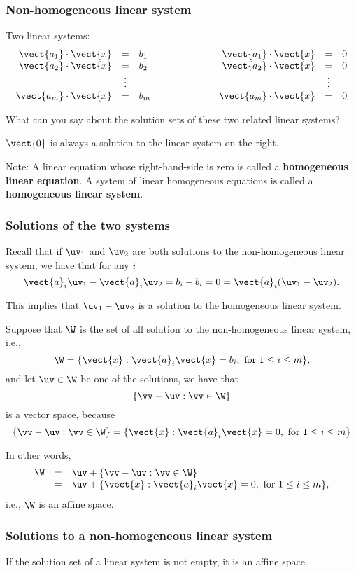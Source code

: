 \begin{frame}
  \frametitle{Non-homogeneous linear system}
  Two linear systems:
  \[
  \begin{array}{rcl}
    \vect{a_1}\cdot\vect{x} &=& b_1 \\
    \vect{a_2}\cdot\vect{x} &=& b_2 \\
    &\vdots&\\
    \vect{a_m}\cdot\vect{x} &=& b_m
  \end{array}
  \ \ \ \ \ \ \ \ \ \ \ \ \ \ \ \ \ \ 
  \begin{array}{rcl}
    \vect{a_1}\cdot\vect{x} &=& 0 \\
    \vect{a_2}\cdot\vect{x} &=& 0 \\
    &\vdots&\\
    \vect{a_m}\cdot\vect{x} &=& 0
  \end{array}
  \]

  What can you say about the solution sets of these two related linear
  systems?

  \pause

  $\vect{0}$ is always a solution to the linear system on the right.

  
  Note: A linear equation whose right-hand-side is zero is called a
  {\bf homogeneous linear equation}.  A system of linear homogeneous
  equations is called a {\bf homogeneous linear system}.
\end{frame}

\begin{frame}
  \frametitle{Solutions of the two systems}

  Recall that if $\uv_1$ and $\uv_2$ are both solutions to the
  non-homogeneous linear system, we have that for any $i$
  \[
  \vect{a}_i \uv_1 - \vect{a}_i \uv_2
  = b_i - b_i = 0 = \vect{a}_i (\uv_1 - \uv_2).
  \]
  \pause

  This implies that $\uv_1-\uv_2$ is a solution to the homogeneous
  linear system.
\end{frame}

\begin{frame}
  Suppose that $\W$ is the set of all solution to the non-homogeneous
  linear system, i.e.,
  \[
  \W = \{\vect{x} : \vect{a}_i\vect{x} = b_i, \ \mbox{for $1\leq i\leq m$}\},
  \]
  and let $\uv\in \W$ be one of the solutions, we have that
  \[
  \{\vv - \uv : \vv\in\W \} 
  \]
  \pause
  is a vector space, because
  \pause
  \[
  \{\vv - \uv : \vv\in\W \}
  =
  \{\vect{x} : \vect{a}_i\vect{x} = 0, \ \mbox{for $1\leq i\leq m$}\}
  \]

  \vspace{0.1in}
  \pause

  In other words,
  \[
  \begin{array}{rcl}
    \W &=& \uv + \{\vv - \uv : \vv\in\W \}  \\
    &=& \uv + \{\vect{x} : \vect{a}_i\vect{x} = 0, \ \mbox{for $1\leq i\leq m$}\},
  \end{array}
  \]
  \pause
  i.e., $\W$ is an affine space.
\end{frame}

\begin{frame}
  \frametitle{Solutions to a non-homogeneous linear system}

  \begin{lemma}
    If the solution set of a linear system is not empty, it is an
    affine space.
  \end{lemma}
\end{frame}
